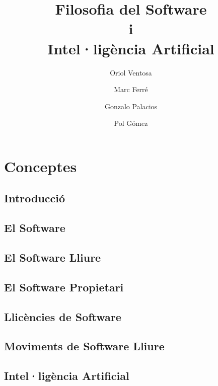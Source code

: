 \documentclass[a4paper,12pt]{report}
\date{}
\begin{document}


\title{
	{\bf Filosofia del Software\\ i \\Intel·ligència Artificial} \\
}
\author{
	Oriol Ventosa \and
	Marc Ferré \and
	Gonzalo Palacios \and
	Pol Gómez
}

\maketitle

\tableofcontents

\part{Conceptes}

\chapter{Introducció}


\chapter{El Software}


\chapter{El Software Lliure}


\chapter{El Software Propietari}


\chapter{Llicències de Software}


\chapter{Moviments de Software Lliure}


\chapter{Intel·ligència Artificial}

\end{document}
